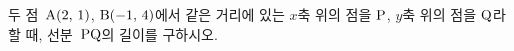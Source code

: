 두 점~$\mathrm{A}(2,\,1)$, $\mathrm{B}(-1,\,4)$에서 같은 거리에 있는 $x$축 위의 점을 $\mathrm{P}$, $y$축 위의 점을 $\mathrm{Q}$라 할 때, 선분~$\mathrm{PQ}$의 길이를 구하시오.

